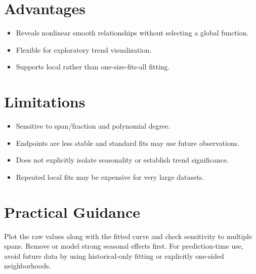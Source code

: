\documentclass[a4paper]{article}
\begin{document}
\section{Advantages}
\begin{itemize}
 \item Reveals nonlinear smooth relationships without selecting a global function.
 \item Flexible for exploratory trend visualization.
 \item Supports local rather than one-size-fits-all fitting.
\end{itemize}

\section{Limitations}
\begin{itemize}
 \item Sensitive to span/fraction and polynomial degree.
 \item Endpoints are less stable and standard fits may use future observations.
 \item Does not explicitly isolate seasonality or establish trend significance.
 \item Repeated local fits may be expensive for very large datasets.
\end{itemize}

\section{Practical Guidance}
Plot the raw values along with the fitted curve and check sensitivity to multiple spans. Remove or model strong seasonal effects first. For prediction-time use, avoid future data by using historical-only fitting or explicitly one-sided neighborhoods.



\end{document}

